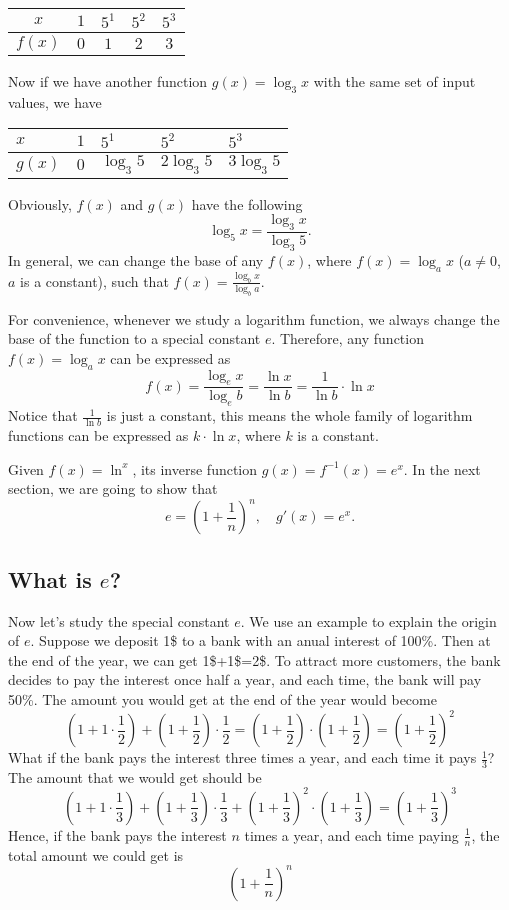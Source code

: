\documentclass[11pt, oneside]{article}   	%
\begin{document}
\renewcommand{\arraystretch}{2}
\begin{center}
\begin{tabular}{|c|c|c|c|c|}
\hline
$x$ & $1$ & $5^1$ & $5^2$ & $5^3$\\
\hline
$f(x)$ & $0$ & $1$ & $2$ & $3$\\
\hline
\end{tabular}
\end{center}

Now if we have another function $g(x)=\log_3x$ with the same set of input values, we have

\renewcommand{\arraystretch}{2}
\begin{center}
\begin{tabular}{|>{\centering}p{1cm}|>{\centering}p{1cm}|>{\centering}p{1cm}|>{\centering}p{1cm}|>{\centering\arraybackslash}p{1cm}|}
\hline
$x$ & $1$ & $5^1$ & $5^2$ & $5^3$\\
\hline
$g(x)$ & $0$ & $\log_3 5$ & $2\log_3 5$ & $3 \log_3 5$\\
\hline
\end{tabular}
\end{center}
Obviously, $f(x)$ and $g(x)$ have the following
\[\log_5 x = \frac{\log_3 x}{\log_3 5} .\]
In general, we can change the base of any $f(x)$, where $f(x) = \log_a x$ ($a \ne 0$, $a$ is a constant), such that 
$f(x)=\frac{\log_b x}{\log_b a}$. 

For convenience, whenever we study a logarithm function, we always change the base of the function to a special constant  $e$. Therefore, any function $f(x)=\log_a x$ can be expressed as \[f(x)=\frac{\log_e x}{\log_e b}= \frac{\ln x}{\ln b}= \frac {1}{\ln b}\cdot \ln x\]
Notice that $\frac{1}{\ln b}$ is just a constant, this means the whole family of logarithm functions can be expressed as $k \cdot \ln x$, where $k$ is a constant.

Given $f(x)=\ln^x$, its inverse function $g(x)=f^{-1}(x)=e^x$. In the next section, we are going to show that 
\[e=\left(1+\frac{1}{n}\right)^n, \quad g'(x)=e^x.\]

\subsection{What is $e$?}
Now let's study the special constant $e$. We use an example to explain the origin of $e$. Suppose we deposit 1\$ to a bank with an anual interest of 100\%. Then at the end of the year, we can get 1\$+1\$=2\$. To attract more customers, the bank decides to pay the interest once half a year, and each time, the bank will pay 50\%. The amount you would get at the end of the year would become 
\[\left(1+1\cdot \frac{1}{2}\right)+\left(1+\frac{1}{2}\right)\cdot \frac{1}{2}=\left(1+\frac{1}{2}\right) \cdot \left(1+\frac{1}{2}\right)=\left(1+\frac{1}{2}\right)^2\]
What if the bank pays the interest three times a year, and each time it pays $\frac{1}{3}$? The amount that we would get should be
\[\left(1+1\cdot \frac{1}{3}\right)+\left(1+\frac{1}{3}\right)\cdot \frac{1}{3}+\left(1+\frac{1}{3}\right)^2 \cdot \left(1+\frac{1}{3}\right)=\left(1+\frac{1}{3}\right)^3\]
Hence, if the bank pays the interest $n$ times a year, and each time paying $\frac{1}{n}$, the total amount we could get is \[\left(1+\frac{1}{n}\right)^n\]
\end{document}
